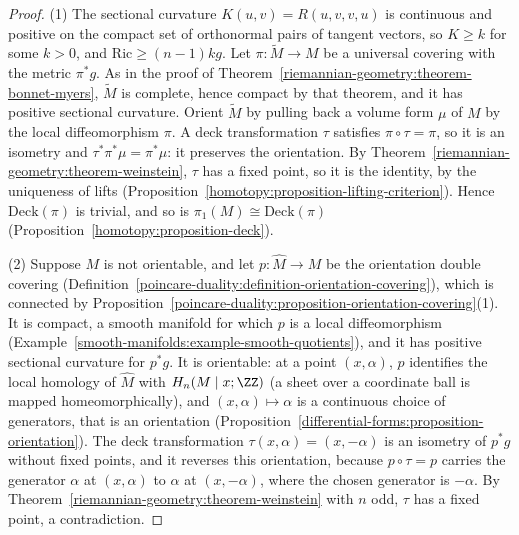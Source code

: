 \begin{proof}
(1) The sectional curvature $K(u, v) = R(u, v, v, u)$ is continuous and positive on the compact set of orthonormal pairs of tangent vectors, so $K \geq k$ for some $k > 0$,
and $\mathrm{Ric} \geq (n - 1)kg$. Let $\pi \colon \widetilde{M} \to M$ be a universal covering with the metric $\pi^*g$. As in the proof of
Theorem~\ref{riemannian-geometry:theorem-bonnet-myers}, $\widetilde{M}$ is complete, hence compact by that theorem, and it has positive sectional curvature. Orient
$\widetilde{M}$ by pulling back a volume form $\mu$ of $M$ by the local diffeomorphism $\pi$. A deck transformation $\tau$ satisfies $\pi \circ \tau = \pi$, so it is an isometry
and $\tau^*\pi^*\mu = \pi^*\mu$: it preserves the orientation. By Theorem~\ref{riemannian-geometry:theorem-weinstein}, $\tau$ has a fixed point, so it is the identity, by the
uniqueness of lifts (Proposition~\ref{homotopy:proposition-lifting-criterion}). Hence $\mathrm{Deck}(\pi)$ is trivial, and so is $\pi_1(M) \cong \mathrm{Deck}(\pi)$
(Proposition~\ref{homotopy:proposition-deck}).

(2) Suppose $M$ is not orientable, and let $p \colon \widehat{M} \to M$ be the orientation double covering (Definition~\ref{poincare-duality:definition-orientation-covering}),
which is connected by Proposition~\ref{poincare-duality:proposition-orientation-covering}(1). It is compact, a smooth manifold for which $p$ is a local diffeomorphism
(Example~\ref{smooth-manifolds:example-smooth-quotients}), and it has positive sectional curvature for $p^*g$. It is orientable: at a point $(x, \alpha)$, $p$ identifies the
local homology of $\widehat{M}$ with $H_n(M \mid x; \ZZ)$ (a sheet over a coordinate ball is mapped homeomorphically), and $(x, \alpha) \mapsto \alpha$ is a continuous choice of
generators, that is an orientation (Proposition~\ref{differential-forms:proposition-orientation}). The deck transformation $\tau(x, \alpha) = (x, -\alpha)$ is an isometry of
$p^*g$ without fixed points, and it reverses this orientation, because $p \circ \tau = p$ carries the generator $\alpha$ at $(x, \alpha)$ to $\alpha$ at $(x, -\alpha)$, where the
chosen generator is $-\alpha$. By Theorem~\ref{riemannian-geometry:theorem-weinstein} with $n$ odd, $\tau$ has a fixed point, a contradiction.
\end{proof}

